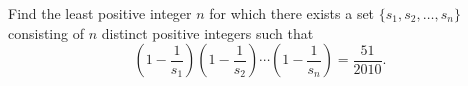Find the least positive integer $n$ for which there exists a set $\{s_1, s_2, \ldots, s_n\}$ consisting of $n$ distinct positive integers such that
\[
\left(1 - \frac{1}{s_1}\right)\left(1 - \frac{1}{s_2}\right) \cdots \left(1 - \frac{1}{s_n}\right) = \frac{51}{2010}.
\]
